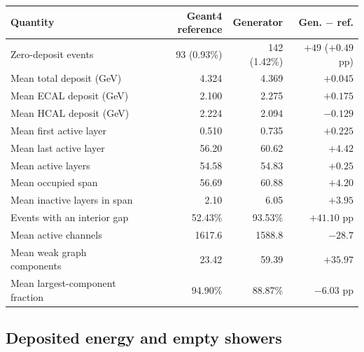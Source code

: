 \documentclass[10pt]{article}
\begin{document}
\begin{center}
\begin{minipage}{\linewidth}
\centering
{}
\label{tab:results}
\small
\begin{tabular}{@{}lrrr@{}}
\toprule
Quantity & Geant4 reference & Generator & Gen. $-$ ref. \\
\midrule
Zero-deposit events & 93 (0.93\%) & 142 (1.42\%) & $+49$ ($+0.49$ pp) \\
Mean total deposit (GeV) & 4.324 & 4.369 & $+0.045$ \\
Mean ECAL deposit (GeV) & 2.100 & 2.275 & $+0.175$ \\
Mean HCAL deposit (GeV) & 2.224 & 2.094 & $-0.129$ \\
\midrule
Mean first active layer & 0.510 & 0.735 & $+0.225$ \\
Mean last active layer & 56.20 & 60.62 & $+4.42$ \\
Mean active layers & 54.58 & 54.83 & $+0.25$ \\
Mean occupied span & 56.69 & 60.88 & $+4.20$ \\
Mean inactive layers in span & 2.10 & 6.05 & $+3.95$ \\
Events with an interior gap & 52.43\% & 93.53\% & $+41.10$ pp \\
Mean active channels & 1617.6 & 1588.8 & $-28.7$ \\
Mean weak graph components & 23.42 & 59.39 & $+35.97$ \\
Mean largest-component fraction & 94.90\% & 88.87\% & $-6.03$ pp \\
\bottomrule
\end{tabular}
\end{minipage}
\end{center}

\subsection{Deposited energy and empty showers}
\end{document}
